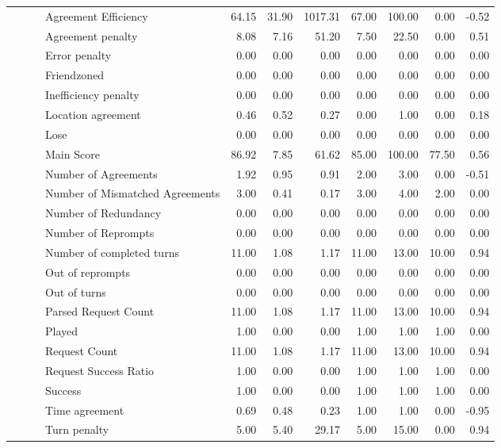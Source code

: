 \begin{tabular}{llllrrrrrrr}
 &  &  & Agreement Efficiency & 64.15 & 31.90 & 1017.31 & 67.00 & 100.00 & 0.00 & -0.52 \\
 &  &  & Agreement penalty & 8.08 & 7.16 & 51.20 & 7.50 & 22.50 & 0.00 & 0.51 \\
 &  &  & Error penalty & 0.00 & 0.00 & 0.00 & 0.00 & 0.00 & 0.00 & 0.00 \\
 &  &  & Friendzoned & 0.00 & 0.00 & 0.00 & 0.00 & 0.00 & 0.00 & 0.00 \\
 &  &  & Inefficiency penalty & 0.00 & 0.00 & 0.00 & 0.00 & 0.00 & 0.00 & 0.00 \\
 &  &  & Location agreement & 0.46 & 0.52 & 0.27 & 0.00 & 1.00 & 0.00 & 0.18 \\
 &  &  & Lose & 0.00 & 0.00 & 0.00 & 0.00 & 0.00 & 0.00 & 0.00 \\
 &  &  & Main Score & 86.92 & 7.85 & 61.62 & 85.00 & 100.00 & 77.50 & 0.56 \\
 &  &  & Number of Agreements & 1.92 & 0.95 & 0.91 & 2.00 & 3.00 & 0.00 & -0.51 \\
 &  &  & Number of Mismatched Agreements & 3.00 & 0.41 & 0.17 & 3.00 & 4.00 & 2.00 & 0.00 \\
 &  &  & Number of Redundancy & 0.00 & 0.00 & 0.00 & 0.00 & 0.00 & 0.00 & 0.00 \\
 &  &  & Number of Reprompts & 0.00 & 0.00 & 0.00 & 0.00 & 0.00 & 0.00 & 0.00 \\
 &  &  & Number of completed turns & 11.00 & 1.08 & 1.17 & 11.00 & 13.00 & 10.00 & 0.94 \\
 &  &  & Out of reprompts & 0.00 & 0.00 & 0.00 & 0.00 & 0.00 & 0.00 & 0.00 \\
 &  &  & Out of turns & 0.00 & 0.00 & 0.00 & 0.00 & 0.00 & 0.00 & 0.00 \\
 &  &  & Parsed Request Count & 11.00 & 1.08 & 1.17 & 11.00 & 13.00 & 10.00 & 0.94 \\
 &  &  & Played & 1.00 & 0.00 & 0.00 & 1.00 & 1.00 & 1.00 & 0.00 \\
 &  &  & Request Count & 11.00 & 1.08 & 1.17 & 11.00 & 13.00 & 10.00 & 0.94 \\
 &  &  & Request Success Ratio & 1.00 & 0.00 & 0.00 & 1.00 & 1.00 & 1.00 & 0.00 \\
 &  &  & Success & 1.00 & 0.00 & 0.00 & 1.00 & 1.00 & 1.00 & 0.00 \\
 &  &  & Time agreement & 0.69 & 0.48 & 0.23 & 1.00 & 1.00 & 0.00 & -0.95 \\
 &  &  & Turn penalty & 5.00 & 5.40 & 29.17 & 5.00 & 15.00 & 0.00 & 0.94 \\

\end{tabular}
